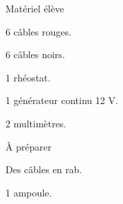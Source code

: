 
\begin{boiteMateriel}{Matériel élève}
  \effectifSeconde

  \begin{protocole}
    \item 6 câbles rouges.
    \item 6 câbles noirs.
    \item 1 rhéostat.
    \item 1 générateur continu 12 V.
    \item 2 multimètres.
  \end{protocole}
\end{boiteMateriel}


\begin{boiteMateriel}{À préparer}
  \begin{protocole}
    \item Des câbles en rab.
    \item 1 ampoule.
  \end{protocole}
\end{boiteMateriel}